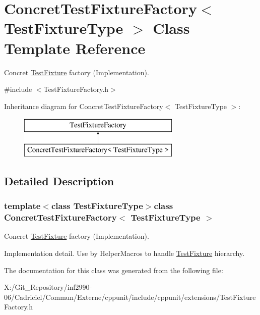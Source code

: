 \hypertarget{class_concret_test_fixture_factory}{\section{Concret\-Test\-Fixture\-Factory$<$ Test\-Fixture\-Type $>$ Class Template Reference}
\label{class_concret_test_fixture_factory}
}


Concret \hyperlink{class_test_fixture}{Test\-Fixture} factory (Implementation).  




{\ttfamily \#include $<$Test\-Fixture\-Factory.\-h$>$}

Inheritance diagram for Concret\-Test\-Fixture\-Factory$<$ Test\-Fixture\-Type $>$\-:\begin{figure}[H]
\begin{center}
\leavevmode
\includegraphics[height=2.000000cm]{class_concret_test_fixture_factory}
\end{center}
\end{figure}


\subsection{Detailed Description}
\subsubsection*{template$<$class Test\-Fixture\-Type$>$class Concret\-Test\-Fixture\-Factory$<$ Test\-Fixture\-Type $>$}

Concret \hyperlink{class_test_fixture}{Test\-Fixture} factory (Implementation). 

Implementation detail. Use by Helper\-Macros to handle \hyperlink{class_test_fixture}{Test\-Fixture} hierarchy. 

The documentation for this class was generated from the following file\-:\begin{DoxyCompactItemize}
\item 
X\-:/\-Git\-\_\-\-Repository/inf2990-\/06/\-Cadriciel/\-Commun/\-Externe/cppunit/include/cppunit/extensions/Test\-Fixture\-Factory.\-h\end{DoxyCompactItemize}
